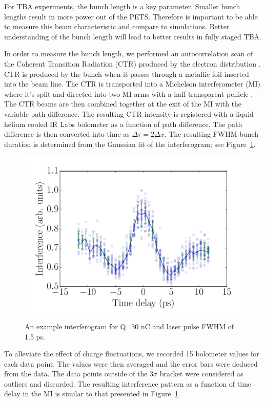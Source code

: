 \label{sec:bunchlength}

For TBA experiments, the bunch length is a key parameter.
Smaller bunch lengths result in more power out of the PETS. 
Therefore is important to be able to measure this beam characteristic 
and compare to simulations. Better understanding of the bunch length
will lead to better results in fully staged TBA.

In order to measure the bunch length, we performed an autocorrelation scan
of the Coherent Transition Radiation (CTR) produced by the electron distribution \cite{Happek, WBarry}.
CTR is produced by the bunch when it passes through a metallic foil inserted into the beam line. 
The CTR is transported into a Michelson interferometer (MI)
where it's split and directed into two MI arms with a half-transparent pellicle \cite{PhysRevSTAB.9.082801}. 
The CTR beams are then combined together at the exit of the MI with the variable path difference.
The resulting CTR intensity is registered with a liquid helium cooled IR Labs
bolometer \cite{IRlabs} as a function of path difference.
The path difference is then converted into time as $\Delta \tau = 2 \Delta x$.
The resulting FWHM bunch duration is determined from the Gaussian fit of 
the interferogram; see Figure~\ref{interferogram}.
\begin{figure}
	\centering
	\includegraphics[width=0.75\linewidth]{images/THPMF048f1}
	\caption{An example interferogram for Q=30 nC and laser pulse FWHM of 1.5 ps.}
	\label{interferogram}
\end{figure}
To alleviate the effect of charge fluctuations, we recorded 15 bolometer values for each data point.
The values were then averaged and the error bars were deduced from the data. The data points
outside of the 3$\sigma$ bracket were considered as outliers and discarded. The resulting
interference pattern as a function of time delay in the MI is similar to that presented in Figure~\ref{interferogram}.

